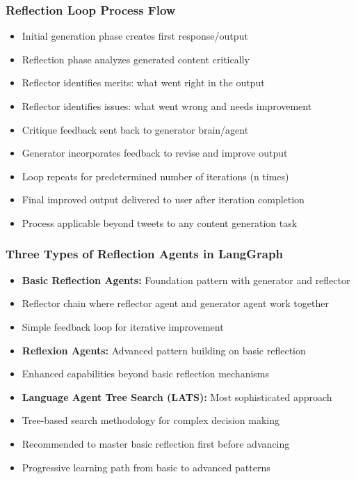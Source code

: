 \begin{frame}[fragile]\frametitle{Reflection Loop Process Flow}
      \begin{itemize}
        \item Initial generation phase creates first response/output
        \item Reflection phase analyzes generated content critically
        \item Reflector identifies merits: what went right in the output
        \item Reflector identifies issues: what went wrong and needs improvement
        \item Critique feedback sent back to generator brain/agent
        \item Generator incorporates feedback to revise and improve output
        \item Loop repeats for predetermined number of iterations (n times)
        \item Final improved output delivered to user after iteration completion
        \item Process applicable beyond tweets to any content generation task
      \end{itemize}
\end{frame}

\begin{frame}[fragile]\frametitle{Three Types of Reflection Agents in LangGraph}
      \begin{itemize}
        \item \textbf{Basic Reflection Agents:} Foundation pattern with generator and reflector
        \item Reflector chain where reflector agent and generator agent work together
        \item Simple feedback loop for iterative improvement
        \item \textbf{Reflexion Agents:} Advanced pattern building on basic reflection
        \item Enhanced capabilities beyond basic reflection mechanisms
        \item \textbf{Language Agent Tree Search (LATS):} Most sophisticated approach
        \item Tree-based search methodology for complex decision making
        \item Recommended to master basic reflection first before advancing
        \item Progressive learning path from basic to advanced patterns
      \end{itemize}
\end{frame}

